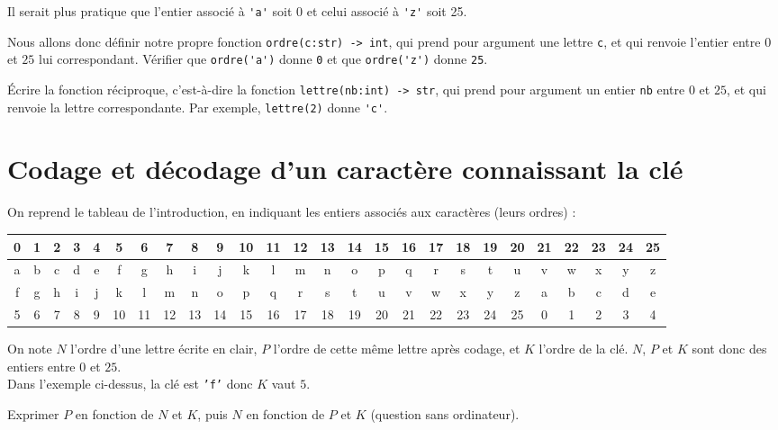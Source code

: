 Il serait plus pratique que l'entier associé à \lstinline{'a'} soit $0$ et celui associé à \lstinline{'z'} soit 25. 

\begin{question}
Nous allons donc définir notre propre fonction \lstinline{ordre(c:str) -> int}, qui prend pour argument une lettre \lstinline{c}, et qui renvoie l'entier entre $0$ et $25$ lui correspondant. Vérifier que \lstinline{ordre('a')} donne \lstinline{0} et que \lstinline{ordre('z')} donne \lstinline{25}.
\end{question}

\begin{question}
\'Ecrire la fonction réciproque, c'est-à-dire la fonction \texttt{\lstinline{lettre(nb:int) -> str}}, qui prend pour argument un entier \texttt{nb} entre $0$ et $25$, et qui renvoie la lettre correspondante. Par exemple, \lstinline{lettre(2)} donne \lstinline{'c'}.
\end{question}

\section*{Codage et décodage d'un caractère connaissant la clé}


On reprend le tableau de l'introduction, en indiquant les entiers associés aux caractères (leurs ordres) :

\begin{table*}[h!]
\centering
\begin{tabular}{|*{26}{c|}}
\hline
0&1&2&3&4&5&6&7&8&9&10&11&12&13&14&15&16&17&18&19&20&21&22&23&24&25\\
\hline
a&b&c&d&e&f&g&h&i&j&k&l&m&n&o&p&q&r&s&t&u&v&w&x&y&z\\
\hline
f&g&h&i&j&k&l&m&n&o&p&q&r&s&t&u&v&w&x&y&z&a&b&c&d&e\\
\hline
5&6&7&8&9&10&11&12&13&14&15&16&17&18&19&20&21&22&23&24&25&0&1&2&3&4\\
\hline
\end{tabular}
\end{table*}
\bigskip
 On note $N$ l'ordre  d'une lettre écrite en clair, $P$ l'ordre  de cette même lettre après codage, et $K$ l'ordre de la clé. $N$, $P$ et $K$ sont donc des entiers entre $0$ et $25$.\\
 Dans l'exemple ci-dessus,  la clé est \texttt{'f'} donc $K$ vaut $5$.\\

\begin{question}
 Exprimer $P$ en fonction de $N$ et $K$, puis $N$ en fonction de $P$ et $K$ (question sans ordinateur).
\end{question}

